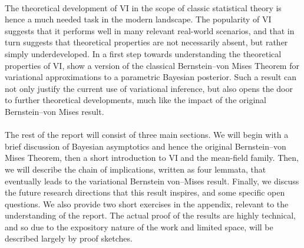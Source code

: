 \paragraph{} The theoretical development of VI in the scope of classic statistical theory is hence a much needed task in the modern landscape. The popularity of VI suggests that it performs well in many relevant real-world scenarios, and that in turn suggests that theoretical properties are not necessarily absent, but rather simply underdeveloped. In a first step towards understanding the theoretical properties of VI, \cite{Wang:2019:VBVM} show a version of the classical Bernstein--von Mises Theorem for variational approximations to a parametric Bayesian posterior. Such a result can not only justify the current use of variational inference, but also opens the door to further theoretical developments, much like the impact of the original Bernstein--von Mises result. 

\paragraph{} The rest of the report will consist of three main sections. We will begin with a brief discussion of Bayesian asymptotics and hence the original Bernstein--von Mises Theorem, then a short introduction to VI and the mean-field family. Then, we will describe the chain of implications, written as four lemmata, that eventually leads to the variational Bernstein von--Mises result. Finally, we discuss the future research directions that this result inspires, and some specific open questions. We also provide two short exercises in the appendix, relevant to the understanding of the report. The actual proof of the results are highly technical, and so due to the expository nature of the work and limited space, will be described largely by proof sketches. 